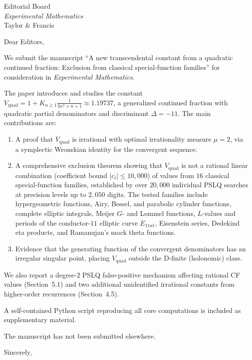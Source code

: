 \documentclass[11pt]{letter}
\begin{document}
\begin{letter}{%
  Editorial Board \\
  \textit{Experimental Mathematics} \\
  Taylor \& Francis}

\opening{Dear Editors,}

We submit the manuscript ``A new transcendental constant from a
quadratic continued fraction: Exclusion from classical
special-function families'' for consideration in
\textit{Experimental Mathematics}.

The paper introduces and studies the constant
$V_{\mathrm{quad}} = 1 + K_{n \ge 1} \frac{1}{3n^2 + n + 1}
\approx 1.19737$, a generalized continued fraction with quadratic
partial denominators and discriminant $\Delta = -11$.  The main
contributions are:

\begin{enumerate}
\item A proof that $V_{\mathrm{quad}}$ is irrational with optimal
  irrationality measure $\mu = 2$, via a symplectic Wronskian
  identity for the convergent sequence.

\item A comprehensive exclusion theorem showing that
  $V_{\mathrm{quad}}$ is not a rational linear combination
  (coefficient bound $|c_i| \le 10{,}000$) of values from $16$
  classical special-function families, established by over
  $20{,}000$ individual PSLQ searches at precision levels up
  to $2{,}050$ digits.  The tested families include hypergeometric
  functions, Airy, Bessel, and parabolic cylinder functions,
  complete elliptic integrals, Meijer $G$- and Lommel functions,
  $L$-values and periods of the conductor-$11$ elliptic curve
  $E_{11a1}$, Eisenstein series, Dedekind eta products, and
  Ramanujan's mock theta functions.

\item Evidence that the generating function of the convergent
  denominators has an irregular singular point, placing
  $V_{\mathrm{quad}}$ outside the D-finite (holonomic) class.
\end{enumerate}

We also report a degree-$2$ PSLQ false-positive mechanism
affecting rational CF values (Section~5.1) and two additional
unidentified irrational constants from higher-order recurrences
(Section~4.5).

A self-contained Python script reproducing all core computations
is included as supplementary material.

The manuscript has not been submitted elsewhere.

\closing{Sincerely,}

\end{letter}
\end{document}

